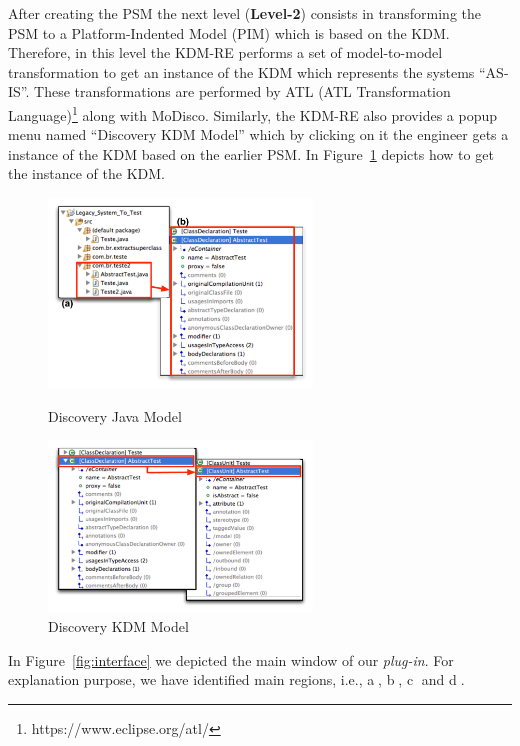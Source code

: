 After creating the PSM the next level (\textbf{Level-2}) consists in transforming the PSM to a Platform-Indented Model (PIM) which is based on the KDM. 
Therefore, in this level the KDM-RE performs a set of model-to-model transformation to get an instance of the KDM which represents the systems ``AS-IS''. 
These transformations are performed by ATL (ATL Transformation Language)\footnote{https://www.eclipse.org/atl/} along with MoDisco.
Similarly, the KDM-RE also provides a popup menu named ``Discovery KDM Model'' which by clicking on it the engineer gets a instance of the KDM based on the earlier PSM.
In Figure~\ref{fig:discovery_kdm_model} depicts how to get the instance of the KDM.

\begin{figure}
\centering
\begin{minipage}{.5\textwidth}
  \centering
  \includegraphics[width=7cm]{figure/GerandoOJAva}
  \caption{Discovery Java Model}
  \label{fig:discovery_java_model}
\end{minipage}%
\begin{minipage}{.5\textwidth}
  \centering
  \includegraphics[width=7cm]{figure/GerandoOKDM}
  \caption{Discovery KDM Model}
  \label{fig:discovery_kdm_model}
\end{minipage}
\end{figure}

In Figure~\ref{fig:interface} we depicted the main window of our \textit{plug-in}. 
For explanation purpose, we have identified main regions, i.e., \textcircled{a}, \textcircled{b}, \textcircled{c} and \textcircled{d}.

